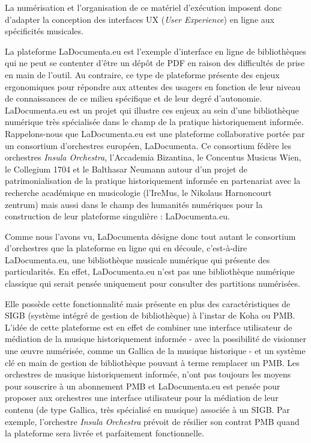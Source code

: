 La numérisation et l’organisation de ce matériel d’exécution imposent donc d’adapter la conception des interfaces UX (\textit{User Experience}) en ligne aux spécificités musicales. 

La plateforme LaDocumenta.eu est l’exemple d’interface en ligne  de bibliothèques qui ne peut se contenter d’être un dépôt de PDF en raison des difficultés de prise en main de l’outil. Au contraire, ce type de plateforme présente des enjeux ergonomiques pour répondre aux attentes des usagers en fonction de leur niveau de connaissances de ce milieu spécifique et de leur degré d’autonomie.
LaDocumenta.eu est un projet qui illustre ces enjeux au sein d'une bibliothèque numérique très spécialisée dans le champ de la pratique historiquement informée. 
Rappelons-nous que LaDocumenta.eu est une plateforme collaborative portée par un consortium d'orchestres européen, LaDocumenta. Ce consortium fédère les orchestres \textit{Insula Orchestra}, l'Accademia Bizantina, le Concentus Musicus Wien, le Collegium 1704 et le Balthasar Neumann autour d'un projet de patrimonialisation de la pratique historiquement informée en partenariat avec la recherche académique en musicologie (l'IreMus, le Nikolaus Harnoncourt zentrum) mais aussi dans le champ des humanités numériques pour la construction de leur plateforme singulière : LaDocumenta.eu.

Comme nous l'avons vu, LaDocumenta désigne donc tout autant le consortium d'orchestres que la plateforme en ligne qui en découle, c'est-à-dire LaDocumenta.eu, une bibliothèque musicale numérique qui présente des particularités. 
En effet, LaDocumenta.eu n'est pas une bibliothèque numérique classique qui serait pensée uniquement pour consulter des partitions numérisées. 

Elle possède cette fonctionnalité mais présente en plus des caractéristiques de SIGB (système intégré de gestion de bibliothèque) à l'instar de Koha ou PMB. L'idée de cette plateforme est en effet de combiner une interface utilisateur de médiation de la musique historiquement informée - avec la possibilité de visionner une œuvre numérisée, comme un Gallica de la musique historique - et un système clé en main de gestion de bibliothèque pouvant à terme remplacer un PMB. 
Les orchestres de musique historiquement informée, n'ont pas toujours les moyens pour souscrire à un abonnement PMB et LaDocumenta.eu est pensée pour proposer aux orchestres une interface utilisateur pour la médiation de leur contenu (de type Gallica, très spécialisé en musique) associée à un SIGB. Par exemple, l'orchestre \textit{Insula Orchestra} prévoit de résilier son contrat PMB quand la plateforme sera livrée et parfaitement fonctionnelle. 

